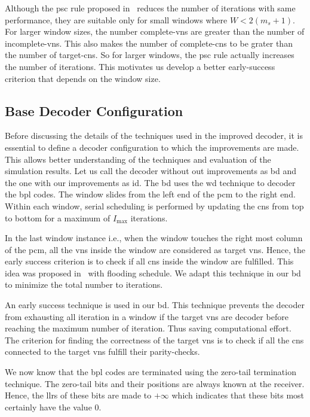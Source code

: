 Although the \ac{psc} rule proposed in~\cite{Kang2018} reduces the number of iterations with same performance, they are suitable only for small windows where $W<2(m_s+1)$. For larger window sizes, the number complete-\acp{vn} are greater than the number of incomplete-\acp{vn}. This also makes the number of complete-\acp{cn} to be grater than the number of target-\acp{cn}. So for larger windows, the \ac{psc} rule actually increases the number of iterations. This motivates us develop a better early-success criterion that depends on the window size.

\subsection{Base Decoder Configuration}
Before discussing the details of the techniques used in the improved decoder, it is essential to define a decoder configuration to which the improvements are made. This allows better understanding of the techniques and evaluation of the simulation results. Let us call the decoder without out improvements as \ac{bd} and the one with our improvements as \ac{id}. The \ac{bd} uses the \ac{wd} technique to decoder the \ac{bpl} codes. The window slides from the left end of the \ac{pcm} to the right end. Within each window, serial scheduling is performed by updating the \acp{cn} from top to bottom for a maximum of $I_{\text{max}}$ iterations.

In the last window instance i.e., when the window touches the right most column of the \ac{pcm}, all the \acp{vn} inside the window are considered as target \acp{vn}. Hence, the early success criterion is to check if all \acp{cn} inside the window are fulfilled. This idea was proposed in~\cite{Ali2018} with flooding schedule. We adapt this technique in our \ac{bd} to minimize the total number to iterations.

An early success technique is used in our \ac{bd}. This technique prevents the decoder from exhausting all iteration in a window if the target \acp{vn} are decoder before reaching the maximum number of iteration. Thus saving computational effort. The criterion for finding the correctness of the target \acp{vn} is to check if all the \acp{cn} connected to the target \acp{vn} fulfill their parity-checks.

We now know that the \ac{bpl} codes are terminated using the zero-tail termination technique. The zero-tail bits and their positions are always known at the receiver. Hence, the \acp{llr} of these bits are made to $+\infty$ which indicates that these bits most certainly have the value 0.

